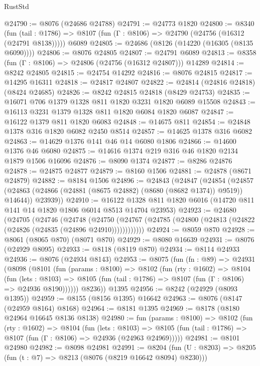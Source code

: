 \begin{lexlean}{RustStd}
\begin{coremodule}
@24790 := @8076 (@24686 @24788)
@24791 := @24773 @1820
@24800 := @8340
    (fun (tail : @1786) => @8107 (fun (Γ : @8106) => @24790 (@24756 (@16312 (@24791 @8138)))))
    @6089
@24805 := @24686 (@8126 (@14220 (@16305 (@8135 @6090))))
@24806 := @8076 @24805
@24807 := @24791 @6089
@24813 := @8358 (fun (Γ : @8106) => @24806 (@24756 (@16312 @24807))) @14289
@24814 := @8242 @24805
@24815 := @24754 @14292
@24816 := @8076 @24815
@24817 := @14295 @16311
@24818 := @24817 @24807
@24822 := @24814 (@24816 @24818) (@8424 @24685)
@24826 := @8242 @24815 @24818 (@8429 @24753)
@24835 := @16071 @706 @1379 @1328 @811 @1820 @3231 @1820 @6089 @15508
@24843 := @16113 @3231 @1379 @1328 @811 @1820 @6084 @1820 @6087
@24847 := @16122 @1379 @811 @1820 @6083
@24848 := @14675 @811
@24854 := @24848 @1378 @316 @1820 @6082 @2450 @8514
@24857 := @14625 @1378 @316 @6082
@24863 := @14629 @1376 @141 @46 @14 @6080 @1806
@24866 := @14600 @1376 @46 @6080
@24875 := @14616 @1374 @219 @316 @46 @1820 @2134 @1879 @1506 @16096
@24876 := @8090 @1374
@24877 := @8286 @24876
@24878 := @24875 @24877
@24879 := @8160 @1506
@24881 := @24878 (@8671 @24879)
@24882 := @8184 @1506
@24896 := @24843
    (@24847
      (@24854
        (@24857 (@24863 (@24866 (@24881 (@8675 @24882) (@8680 (@8682 @1374)) @9519)) @14644))
        @23939))
@24910 := @16122 @1328 @811 @1820 @6016 (@14720 @811 @141 @14 @1820 @1806 @6014 @8513 @14704 @23953)
@24923 := @24680
    (@24705
      (@24746
        (@24748
          (@24750 (@24767 (@24785 (@24800 (@24813 (@24822 (@24826 (@24835 (@24896 @24910))))))))))))
@24924 := @8059 @870
@24928 := @8061 (@8065 @870) (@8071 @870)
@24929 := @8080 @16639
@24931 := @8076 (@24929 @8095)
@24933 := @8118 (@8119 @870)
@24934 := @8114 @24933
@24936 := @8076 (@24934 @8143)
@24953 := @8075
    (fun (fn : @89) =>
    @24931
      (@8098
        (@8101
          (fun (params : @8100) =>
          @8102
            (fun (rty : @1602) =>
            @8104
              (fun (lets : @8103) =>
              @8105 (fun (tail : @1786) => @8107 (fun (Γ : @8106) => @24936 @8190))))))
        @8236))
    @1395
@24956 := @8242 (@24929 (@8093 @1395))
@24959 := @8155 (@8156 @1395) @16642
@24963 := @8076 (@8147 (@24959 @8164) @8168)
@24964 := @8181 @1395
@24969 := @8178 (@8180 @24964 @16645 @8136 @8138)
@24980 := fun (params : @8100) =>
  @8102
    (fun (rty : @1602) =>
    @8104
      (fun (lets : @8103) =>
      @8105 (fun (tail : @1786) => @8107 (fun (Γ : @8106) => @24936 (@24963 @24969)))))
@24981 := @8101 @24980
@24982 := @8098 @24981
@24991 := @8204
    (fun (U : @8203) => @8205 (fun (t : @7) => @8213 (@8076 (@8219 @16642 @8094) @8230)))

\end{coremodule}
\end{lexlean}

